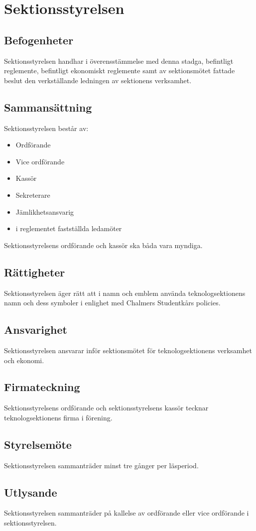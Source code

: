 \section{Sektionsstyrelsen}
\subsection{Befogenheter}
Sektionsstyrelsen handhar i överensstämmelse med denna stadga, befintligt reglemente, befintligt ekonomiskt reglemente samt av sektionsmötet fattade beslut den verkställande ledningen av sektionens verksamhet.
\subsection{Sammansättning}
Sektionsstyrelsen består av:
\begin{itemize}
\item Ordförande
\item Vice ordförande
\item Kassör
\item Sekreterare
\item Jämlikhetsansvarig
\item i reglementet fastställda ledamöter
\end{itemize}
Sektionsstyrelsens ordförande och kassör ska båda vara myndiga.
\subsection{Rättigheter}
Sektionsstyrelsen äger rätt att i namn och emblem använda teknologsektionens namn och dess symboler i enlighet med Chalmers Studentkårs policies.
\subsection{Ansvarighet}
Sektionsstyrelsen ansvarar inför sektionsmötet för teknologsektionens verksamhet och ekonomi.
\subsection{Firmateckning}
Sektionsstyrelsens ordförande och sektionsstyrelsens kassör tecknar teknologsektionens firma i förening.
\subsection{Styrelsemöte}
Sektionsstyrelsen sammanträder minst tre gånger per läsperiod.
\subsection{Utlysande}
Sektionsstyrelsen sammanträder på kallelse av ordförande eller vice ordförande i sektionsstyrelsen.

